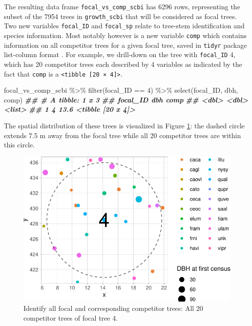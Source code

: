 \documentclass[12pt]{article}
\newenvironment{Shaded}{\begin{snugshade}}{\end{snugshade}}
\newcommand{\DecValTok}[1]{\textcolor[rgb]{0.00,0.00,0.81}{#1}}
\newcommand{\DocumentationTok}[1]{\textcolor[rgb]{0.56,0.35,0.01}{\textbf{\textit{#1}}}}
\newcommand{\FunctionTok}[1]{\textcolor[rgb]{0.00,0.00,0.00}{#1}}
\newcommand{\NormalTok}[1]{#1}
\newcommand{\SpecialCharTok}[1]{\textcolor[rgb]{0.00,0.00,0.00}{#1}}
\begin{document}
The resulting data frame \texttt{focal\_vs\_comp\_scbi} has 6296 rows,
representing the subset of the 7954 trees in \texttt{growth\_scbi} that
will be considered as focal trees. Two new variables \texttt{focal\_ID}
and \texttt{focal\_sp} relate to tree-stem identification and species
information. Most notably however is a new variable \texttt{comp} which
contains information on all competitor trees for a given focal tree,
saved in \texttt{tidyr} package list-column format
\citet{tidyr_package}. For example, we drill-down on the tree with
\texttt{focal\_ID} 4, which has 20 competitor trees each described by 4
variables as indicated by the fact that \texttt{comp} is a
\texttt{\textless{}tibble\ {[}20\ ×\ 4{]}\textgreater{}}.

\begin{Shaded}
\begin{Highlighting}[]
\NormalTok{focal\_vs\_comp\_scbi }\SpecialCharTok{\%\textgreater{}\%} 
  \FunctionTok{filter}\NormalTok{(focal\_ID }\SpecialCharTok{==} \DecValTok{4}\NormalTok{) }\SpecialCharTok{\%\textgreater{}\%} 
  \FunctionTok{select}\NormalTok{(focal\_ID, dbh, comp)}
\DocumentationTok{\#\# \# A tibble: 1 x 3}
\DocumentationTok{\#\#   focal\_ID   dbh comp             }
\DocumentationTok{\#\#      \textless{}dbl\textgreater{} \textless{}dbl\textgreater{} \textless{}list\textgreater{}           }
\DocumentationTok{\#\# 1        4  13.6 \textless{}tibble [20 x 4]\textgreater{}}
\end{Highlighting}
\end{Shaded}

The spatial distribution of these trees is visualized in Figure
\ref{fig:scbi-focal-vs-comp-map}: the dashed circle extends 7.5 m away
from the focal tree while all 20 competitor trees are within this
circle.

\begin{figure}

{\centering \includegraphics[width=0.66\linewidth]{Figures/scbi-focal-vs-comp-map-1} 

}

\caption{Identify all focal and corresponding competitor trees: All 20 competitor trees of focal tree 4.}\label{fig:scbi-focal-vs-comp-map}
\end{figure}
\end{document}
